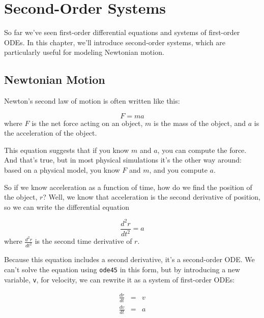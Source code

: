 \chapter{Second-Order Systems}

So far we've seen first-order differential equations and systems of first-order ODEs.  In this chapter, we'll introduce second-order systems, which are particularly useful for modeling Newtonian motion.


\section{Newtonian Motion}

Newton's second law of motion is often written like this:

\begin{equation*}
    F = m a
\end{equation*}
where $F$ is the net force acting on an object, $m$ is the
mass of the object, and $a$ is the acceleration of the object.

This equation suggests
that if you know $m$ and $a$, you can compute the force. And that's true,
but in most physical simulations it's the other way around: based on a
physical model, you know $F$ and $m$, and you compute $a$.


So if we know acceleration as a function of time, how do we
find the position of the object, $r$?  Well, we know that acceleration
is the second derivative of position, so we can write the differential
equation

\begin{equation*}
    \frac{d^2r}{dt^2} = a
\end{equation*}
where $\frac{d^2r}{dt^2}$ is the second time derivative of $r$.

Because this equation includes a second derivative, it's
a second-order ODE.  We can't solve the equation using \lstinline{ode45} in this form, but
by introducing a new variable, \lstinline{v}, for velocity, we can rewrite it
as a system of first-order ODEs:

\begin{eqnarray*}
    \frac{dr}{dt} &=& v   \\
    \frac{dv}{dt} &=& a
\end{eqnarray*}

